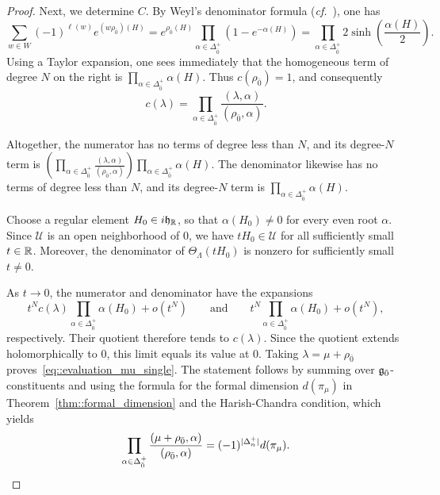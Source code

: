 \begin{proof}
Next, we determine $C$. By Weyl's denominator formula (\emph{cf.}~\cite[Corollary~25.5]{EtingofLieGroupsLieAlgebras}), one has 
\[
\sum_{w\in W}(-1)^{\ell(w)}
e^{(w\rho_{\bar0})(H)}
=
e^{\rho_{\bar0}(H)}
\prod_{\alpha\in\Delta_{\bar0}^{+}}(1-e^{-\alpha(H)})
=
\prod_{\alpha\in\Delta_{\bar0}^{+}}
2\sinh\!\left(\frac{\alpha(H)}2\right).
\]
Using a Taylor expansion, one sees immediately that the homogeneous term of degree $N$ on the right is
$\prod_{\alpha\in\Delta_{\bar0}^{+}}\alpha(H)$. Thus
$c(\rho_{\bar0})=1$, and consequently
\[
c(\lambda)
=
\prod_{\alpha\in\Delta_{\bar0}^{+}}
\frac{(\lambda,\alpha)}{(\rho_{\bar0},\alpha)}.
\]

Altogether, the numerator has no terms of degree less than $N$, and its degree-$N$ term is
$
\left(
\prod_{\alpha\in\Delta_{\bar0}^{+}}
\frac{(\lambda,\alpha)}{(\rho_{\bar0},\alpha)}
\right)
\prod_{\alpha\in\Delta_{\bar0}^{+}}\alpha(H).
$
The denominator likewise has no terms of degree less than $N$, and its degree-$N$ term is
$
\prod_{\alpha\in\Delta_{\bar0}^{+}}\alpha(H).
$

Choose a regular element $H_0\in i{\mathfrak h}_{{\mathbb R}}$, so that $\alpha(H_0)\neq0$ for every even root $\alpha$. Since $\mathcal U$ is an open neighborhood of $0$, we have $tH_0\in\mathcal U$ for all sufficiently small $t\in{\mathbb R}$. Moreover, the denominator of $\Theta_\Lambda(tH_0)$ is nonzero for sufficiently small $t\neq0$.

As $t\to0$, the numerator and denominator have the expansions
\[
t^N c(\lambda)
\prod_{\alpha\in\Delta_{\bar0}^+}\alpha(H_0)
+o(t^N)
\qquad\text{and}\qquad
t^N\prod_{\alpha\in\Delta_{\bar0}^+}\alpha(H_0)
+o(t^N),
\]
respectively. Their quotient therefore tends to $c(\lambda)$. Since the quotient extends holomorphically to $0$, this limit equals its value at $0$. Taking $\lambda=\mu+\rho_{\bar0}$ proves~\eqref{eq::evaluation_mu_single}. 
The statement follows by summing over ${\mathfrak{g}_{\bar{0}}}$-constituents and using the formula for the formal dimension $d(\pi_{\mu})$ in Theorem~\ref{thm::formal_dimension} and the Harish-Chandra condition, which yields
\[
\prod_{\alpha\in\Delta_{\bar0}^{+}}
\frac{(\mu+\rho_{\bar0},\alpha)}
     {(\rho_{\bar0},\alpha)}
=
(-1)^{|\Delta_n^+|}d(\pi_\mu).\qedhere
\]
\end{proof}


